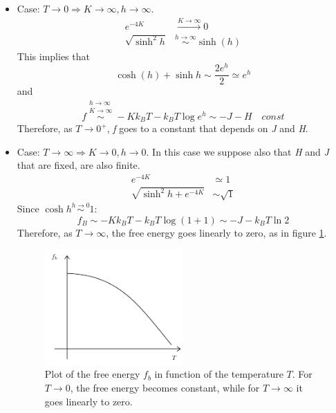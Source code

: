 \documentclass[../main/main.tex]{subfiles}
\begin{document}
\begin{itemize}
\item Case: \( T \rightarrow 0  \Rightarrow K \rightarrow \infty , h \rightarrow \infty  \).
\begin{subequations}
\begin{align}
  e^{-4K} & \overset{K \rightarrow \infty }{\longrightarrow} 0  \\
  \sqrt{\sinh^2 h} & \overset{h \rightarrow \infty }{\sim } \sinh (h)
\end{align}
\end{subequations}
This implies that
\begin{equation}
\cosh(h) + \sinh h \sim \frac{2 e^{h} }{2} \simeq e^{h}
\end{equation}
and
\begin{equation}
  f \overset{\substack{h \rightarrow \infty  \\ K \rightarrow \infty  } }{\sim } - K k_B T - k_B T \log{e^{h} } \sim -J -H \quad const
\end{equation}
Therefore, as \( T \rightarrow 0^+ \), \emph{f} goes to a constant that depends on \emph{J} and \emph{H}.

\item  Case: \( T \rightarrow \infty   \Rightarrow K \rightarrow 0 , h \rightarrow 0  \).
In this case we suppose also that \emph{H} and \emph{J} that are fixed, are also finite.
\begin{subequations}
\begin{align}
  e^{-4K} & \simeq 1  \\
  \sqrt{\sinh^2 h + e^{-4K} } & \sim \sqrt{1}
\end{align}
\end{subequations}
Since \( \cosh h \overset{h \rightarrow 0}{\sim } 1  \):
\begin{equation}
  f_B \sim  -K k_B T - k_B T \log{(1+1)} \sim  -J -k_B T \ln{2}
\end{equation}
Therefore, as \( T \rightarrow \infty  \), the free energy goes linearly to zero, as in figure \ref{fig:8_1}.
\begin{figure}[h!]
\centering
\includegraphics[width=0.5\textwidth]{../lessons/8_image/1.pdf}
\caption{\label{fig:8_1} Plot of the free energy \( f_b \) in function of the temperature \( T \). For \( T \rightarrow 0 \), the free energy becomes constant, while for \( T \rightarrow \infty  \) it goes linearly to zero.  }
\end{figure}
\end{itemize}
\end{document}

